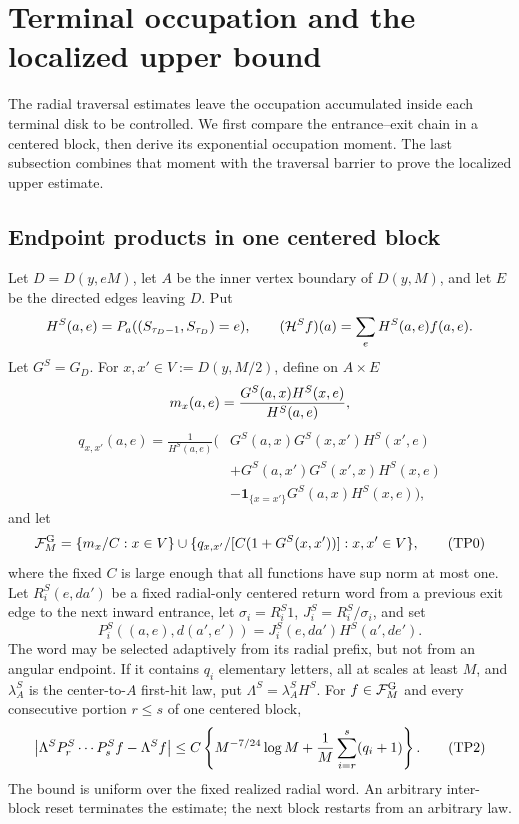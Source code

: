 \section{Terminal occupation and the localized upper bound}
\label{sec:terminal-upper}

The radial traversal estimates leave the occupation accumulated inside each terminal disk to be controlled. We first compare the entrance--exit chain in a centered block, then derive its exponential occupation moment. The last subsection combines that moment with the traversal barrier to prove the localized upper estimate.

\subsection{Endpoint products in one centered block}
\begin{lemma}\label{lem:typed-centered-endpoint-product}
Let \(D=D(y,eM)\), let \(A\) be the inner vertex boundary of
\(D(y,M)\), and let \(E\) be the directed edges leaving \(D\).  Put
\[
 H^S(a,e)=P_a((S_{\tau_D-1},S_{\tau_D})=e),\qquad
 ({\cal H}^Sf)(a)=\sum_eH^S(a,e)f(a,e).
\]
Let \(G^S=G_D\).  For \(x,x'\in V:=D(y,M/2)\), define on
\(A\times E\)
\[
 m_x(a,e)={G^S(a,x)H^S(x,e)\over H^S(a,e)},
\]
\[
\begin{aligned}
q_{x,x'}(a,e)=\frac{1}{H^S(a,e)}\big(&G^S(a,x)G^S(x,x')H^S(x',e)\\
  &+G^S(a,x')G^S(x',x)H^S(x,e)\\
  &-\mathbf1_{\{x=x'\}}G^S(a,x)H^S(x,e)\big),
\end{aligned}
\]
and let
\begin{equation}
 {\cal F}_M^{\rm G}=\{m_x/C:x\in V\}\cup
 \{q_{x,x'}/[C(1+G^S(x,x'))]:x,x'\in V\},               \tag{TP0}\label{eq:tu-TP0}
\end{equation}
where the fixed \(C\) is large enough that all functions have sup norm
at most one.
Let \(R_i^S(e,da')\) be a fixed radial-only centered return word from a
previous exit edge to the next inward entrance, let
\(\sigma_i=R_i^S1\), \(J_i^S=R_i^S/\sigma_i\), and set
\begin{equation}
 P_i^S((a,e),d(a',e'))=J_i^S(e,da')H^S(a',de').           \tag{TP1}\label{eq:tu-TP1}
\end{equation}
The word may be selected adaptively from its radial prefix, but not from an
angular endpoint.  If it contains \(q_i\) elementary letters, all at scales
at least \(M\), and \(\lambda_A^S\) is the center-to-\(A\) first-hit law,
put \(\Lambda^S=\lambda_A^SH^S\).  For \(f\in{\cal F}_M^{\rm G}\) and
every consecutive portion \(r\le s\) of
one centered block,
\begin{equation}
 \left|\Lambda^SP_r^S\cdots P_s^Sf-\Lambda^Sf\right|
 \le C\left\{M^{-7/24}\log M+{1\over M}
                   \sum_{i=r}^s(q_i+1)\right\}.            \tag{TP2}\label{eq:tu-TP2}
\end{equation}
The bound is uniform over the fixed realized radial word.  An arbitrary
inter-block reset terminates the estimate; the next block restarts from an
arbitrary law.
\end{lemma}

